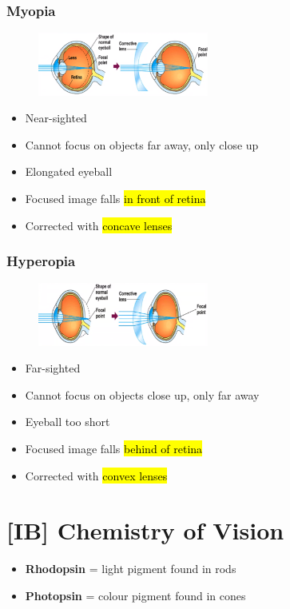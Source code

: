 \documentclass[a4paper,12pt]{article}
\begin{document}
\subsubsection{Myopia}
\begin{figure}[H]
    \centering
    \includegraphics[width=0.50\textwidth]{myopia}
\end{figure}
\begin{itemize}
    \item{Near-sighted}
    \item{Cannot focus on objects far away, only close up}
    \item{Elongated eyeball}
    \item{Focused image falls \hl{in front of retina}}
    \item{Corrected with \hl{concave lenses}}
\end{itemize}

\subsubsection{Hyperopia}
\begin{figure}[H]
    \centering
    \includegraphics[width=0.50\textwidth]{hyperopia}
\end{figure}
\begin{itemize}
    \item{Far-sighted}
    \item{Cannot focus on objects close up, only far away}
    \item{Eyeball too short}
    \item{Focused image falls \hl{behind of retina}}
    \item{Corrected with \hl{convex lenses}}
\end{itemize}

\pagebreak

\section{[IB] Chemistry of Vision}
\begin{itemize}
    \item{\textbf{Rhodopsin} = light pigment found in rods}
    \item{\textbf{Photopsin} = colour pigment found in cones}
\end{itemize}
\end{document}
